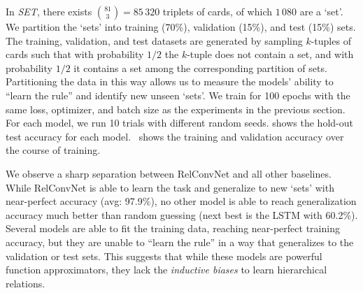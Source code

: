 
In \textit{SET}, there exists $\binom{81}{3} = 85\,320$ triplets of cards, of which $1\,080$ are a `set'. We partition the `sets' into training (70\%), validation (15\%), and test (15\%) sets. The training, validation, and test datasets are generated by sampling $k$-tuples of cards such that with probability $1/2$ the $k$-tuple does not contain a set, and with probability $1/2$ it contains a set among the corresponding partition of sets. Partitioning the data in this way allows us to measure the models' ability to ``learn the rule'' and identify new unseen `sets'.
We train for 100 epochs with the same loss, optimizer, and batch size as the experiments in the previous section. For each model, we run 10 trials with different random seeds.
 shows the hold-out test accuracy for each model.~ shows the training and validation accuracy over the course of training.

We observe a sharp separation between RelConvNet and all other baselines. While RelConvNet is able to learn the task and generalize to new `sets' with near-perfect accuracy (avg: 97.9\%), no other model is able to reach generalization accuracy much better than random guessing (next best is the LSTM with 60.2\%). Several models are able to fit the training data, reaching near-perfect training accuracy, but they are unable to ``learn the rule'' in a way that generalizes to the validation or test sets. This suggests that while these models are powerful function approximators, they lack the \textit{inductive biases} to learn hierarchical relations.

